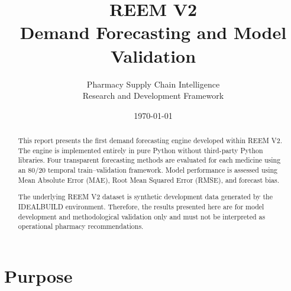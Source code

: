 \documentclass[11pt,a4paper]{article}
\title{
\textcolor{titleColor}{
\textbf{REEM V2}\\[0.3cm]
Demand Forecasting and Model Validation
}
}
\author{
Pharmacy Supply Chain Intelligence\\
Research and Development Framework
}
\date{\today}
\begin{document}
\maketitle

\begin{center}
\end{center}

\begin{abstract}
This report presents the first demand forecasting engine developed within
REEM V2. The engine is implemented entirely in pure Python without
third-party Python libraries. Four transparent forecasting methods are
evaluated for each medicine using an 80/20 temporal train--validation
framework. Model performance is assessed using Mean Absolute Error (MAE),
Root Mean Squared Error (RMSE), and forecast bias.

The underlying REEM V2 dataset is synthetic development data generated by
the IDEALBUILD environment. Therefore, the results presented here are for
model development and methodological validation only and must not be
interpreted as operational pharmacy recommendations.
\end{abstract}

\section{Purpose}
\end{document}
